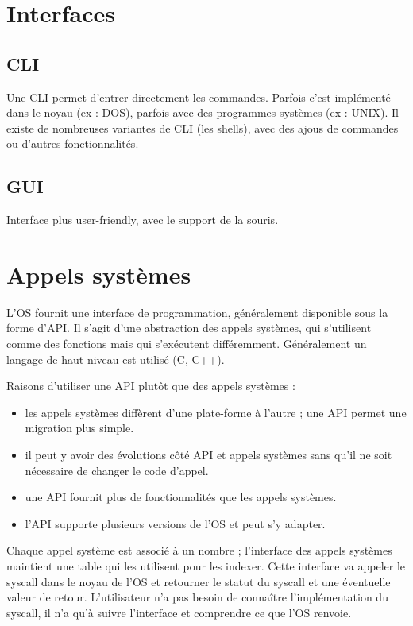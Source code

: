 

\section{Interfaces}

	\subsection{CLI}
	
	Une CLI permet d'entrer directement les commandes. Parfois c'est implémenté dans le noyau (ex : DOS), parfois avec des programmes systèmes (ex : UNIX). Il existe de nombreuses variantes de CLI (les shells), avec des ajous de commandes ou d'autres fonctionnalités. 
	
	\subsection{GUI}
	
	Interface plus user-friendly, avec le support de la souris.
	
\section{Appels systèmes}

L'OS fournit une interface de programmation, généralement disponible sous la forme d'API. Il s'agit d'une abstraction des appels systèmes, qui s'utilisent comme des fonctions mais qui s'exécutent différemment. Généralement un langage de haut niveau est utilisé (C, C++).

Raisons d'utiliser une API plutôt que des appels systèmes :

\begin{itemize}
	\item les appels systèmes diffèrent d'une plate-forme à l'autre ; une API permet une migration plus simple.
	\item il peut y avoir des évolutions côté API et appels systèmes sans qu'il ne soit nécessaire de changer le code d'appel.
	\item une API fournit plus de fonctionnalités que les appels systèmes.
	\item l'API supporte plusieurs versions de l'OS et peut s'y adapter.
\end{itemize}

Chaque appel système est associé à un nombre ; l'interface des appels systèmes maintient une table qui les utilisent pour les indexer. Cette interface va appeler le syscall dans le noyau de l'OS et retourner le statut du syscall et une éventuelle valeur de retour. L'utilisateur n'a pas besoin de connaître l'implémentation du syscall, il n'a qu'à suivre l'interface et comprendre ce que l'OS renvoie.

